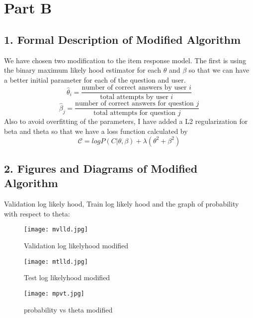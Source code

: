 \documentclass[12pt]{article}
\begin{document}
\section*{Part B}
\subsection*{1. Formal Description of Modified Algorithm}
We have chosen two modification to the item response model. The first is using the binary maximum likely hood estimator for each $\theta$ and $\beta$ so that we can have a better initial parameter for each of the question and user.
$$\hat{\theta}_i = \frac{{\text{{number of correct answers by user }} i}}{{\text{{total attempts by user }} i}}$$
$$\hat{\beta}_j = \frac{{\text{{number of correct answers for question }} j}}{{\text{{total attempts for question }} j}}
$$
Also to avoid overfitting of the parameters, I have added a L2 regularization for beta and theta so that we have a loss function calculated by
$$\mathcal{C} = logP(C|\theta,\beta)+\lambda(\theta^2+\beta^2)$$
\subsection*{2. Figures and Diagrams of Modified Algorithm}
Validation log likely hood, Train log likely hood and the graph of probability with respect to theta:
\begin{figure}[h]
    \begin{minipage}{0.4\textwidth}
    \centering
    \texttt{[image: mvlld.jpg]}
    \caption{Validation log likelyhood modified}
    \label{fig:vlld}
    \end{minipage}%
    \begin{minipage}{0.4\textwidth}
    \centering
    \texttt{[image: mtlld.jpg]}
    \caption{Test log likelyhood modified}
    \label{fig:tlld}
    \end{minipage}%
\end{figure}
\begin{figure}[h]
\centering
\texttt{[image: mpvt.jpg]}
\caption{probability vs theta modified}
\end{figure}
\newpage
\end{document}

